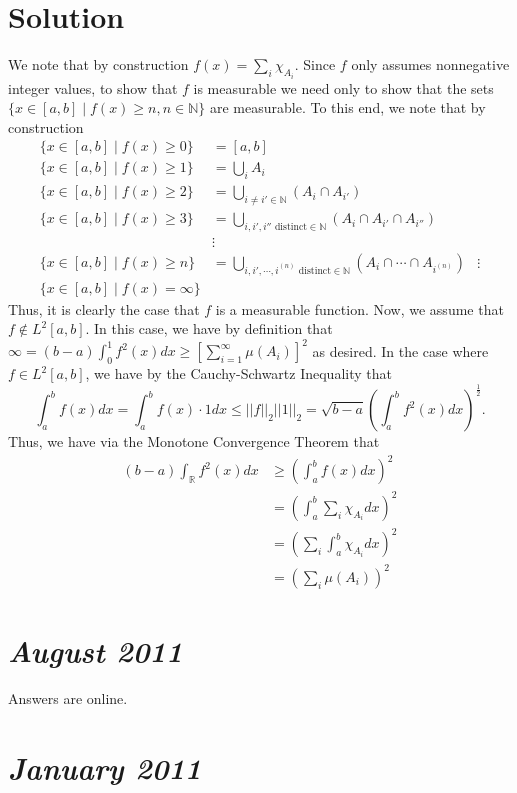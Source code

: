 \documentclass{article}
\begin{document}
\section*{Solution}
We note that by construction $f(x)=\sum_i\chi_{A_i}$.  Since $f$ only assumes nonnegative integer values, to show that $f$ is measurable we need only to show that the sets $\{x\in[a,b]\mid f(x)\geq n,n\in\mathbb{N}\}$ are measurable.  To this end, we note that by construction
\begin{align*}
\{x\in[a,b]\mid f(x)\geq 0\}&=[a,b]\\
\{x\in[a,b]\mid f(x)\geq 1\}&=\bigcup_iA_i\\
\{x\in[a,b]\mid f(x)\geq 2\}&=\bigcup_{i\neq i'\in\mathbb{N}}(A_i\cap A_{i'})\\
\{x\in[a,b]\mid f(x)\geq 3\}&=\bigcup_{i,i',i''\text{ distinct}\in\mathbb{N}}(A_i\cap A_{i'}\cap A_{i''})\\
&\vdots\\
\{x\in[a,b]\mid f(x)\geq n\}&=\bigcup_{i,i',\cdots,i^{(n)}\text{ distinct}\in\mathbb{N}}(A_i\cap\cdots\cap A_{i^{(n)}})
&\vdots\\
\{x\in[a,b]\mid f(x)=\infty\}
\end{align*}
Thus, it is clearly the case that $f$ is a measurable function.  Now, we assume that $f\not\in L^2[a,b]$.  In this case, we have by definition that $\infty=(b-a)\int_0^1f^2(x)dx\geq\left[\sum_{i=1}^\infty\mu(A_i)\right]^2$ as desired.  In the case where $f\in L^2[a,b]$, we have by the Cauchy-Schwartz Inequality that $$\int_a^bf(x)dx=\int_a^bf(x)\cdot 1dx\leq||f||_2||1||_2=\sqrt{b-a}\left(\int_a^bf^2(x)dx\right)^\frac{1}{2}.$$  Thus, we have via the Monotone Convergence Theorem that
\begin{align*}
(b-a)\int_\mathbb{R}f^2(x)dx&\geq\left(\int_a^bf(x)dx\right)^2\\
&=\left(\int_a^b\sum_i\chi_{A_i}dx\right)^2\\
&=\left(\sum_i\int_a^b\chi_{A_i}dx\right)^2\\
&=\left(\sum_i\mu(A_i)\right)^2
\end{align*}

\section*{{\it August 2011}}
Answers are online.

\section*{{\it January 2011}}
\end{document}
